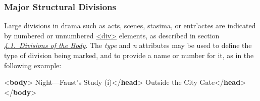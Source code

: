 \subsubsection[{Major Structural Divisions}]{Major Structural Divisions}\label{DRDIV}\par
Large divisions in drama such as acts, scenes, stasima, or entr'actes are indicated by numbered or unnumbered \hyperref[TEI.div]{<div>} elements, as described in section \textit{\hyperref[DSDIV]{4.1.\ Divisions of the Body}}. The {\itshape type} and {\itshape n} attributes may be used to define the type of division being marked, and to provide a name or number for it, as in the following example: \par\bgroup{}\exampleFont \begin{shaded}\noindent\mbox{}{<\textbf{body}>}\mbox{}\newline 
{}\mbox{}\newline 
\hspace*{1em}Night—Faust's Study (i){</\textbf{head}>}\mbox{}\newline 
{}\mbox{}\newline 
{}\mbox{}\newline 
\hspace*{1em}Outside the City Gate{</\textbf{head}>}\mbox{}\newline 
{}\mbox{}\newline 
{</\textbf{body}>}\end{shaded}\egroup\par \noindent  \par
